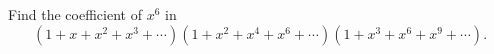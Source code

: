 Find the coefficient of $x^6$ in
\[
\left(1+x+x^2+x^3+\cdots\right)\left(1+x^2+x^4+x^6+\cdots\right)\left(1+x^3+x^6+x^9+\cdots\right).
\]
